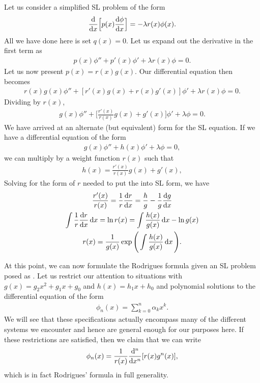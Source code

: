 Let us consider a simplified SL problem of the form
\begin{eqnarray}
    \dv{x} \Big[ p(x) \dv{\phi}{x} \Big] = -\lambda r(x) \phi(x)
.\end{eqnarray}
All we have done here is set $q(x) = 0$.
Let us expand out the derivative in the first term as
\begin{eqnarray}
    p(x) \phi'' + p'(x) \phi' + \lambda r(x) \phi = 0
.\end{eqnarray}
Let us now present $p(x) = r(x) g(x)$.
Our differential equation then becomes
\begin{eqnarray}
    r(x) g(x) \phi'' + [r'(x) g(x) + r(x) g'(x)] \phi' + \lambda r(x) \phi = 0
.\end{eqnarray}
Dividing by $r(x)$,
\begin{eqnarray}
    g(x) \phi'' + \Big[ \frac{r'(x)}{r(x)} g(x) + g'(x) \Big] \phi' + \lambda \phi = 0
.\end{eqnarray}
We have arrived at an alternate (but equivalent) form for the SL equation.
If we have a differential equation of the form
\begin{eqnarray}
    \label{eq:general-2nd-ode}
    g(x) \phi'' + h(x) \phi' + \lambda \phi = 0
,\end{eqnarray}
we can multiply by a weight function $r(x)$ such that
\begin{eqnarray}
    h(x) = \frac{r'(x)}{r(x)} g(x) + g'(x)
,\end{eqnarray}
Solving for the form of $r$ needed to put the  into SL form, we have
\begin{gather}
    \frac{r'(x)}{r(x)} = \frac{1}{r} \dv{r}{x} = \frac{h}{g} - \frac{1}{g}\dv{g}{x} \nonumber \\
    \int \frac{1}{r}\dv{r}{x} \dd{x} = \ln{r(x)} = \int \frac{h(x)}{g(x)} \dd{x} - \ln{g(x)} \nonumber \\
    r(x) = \frac{1}{g(x)} \exp\Bigg( \int \frac{h(x)}{g(x)} \dd{x} \Bigg)
.\end{gather}

At this point, we can now formulate the Rodrigues formula given an SL problem posed as .
Let us restrict our attention to situations with $g(x) = g_2 x^2 + g_1 x + g_0$ and $h(x) = h_1 x + h_0$ and polynomial solutions to the differential equation of the form
\begin{eqnarray}
    \phi_{n}(x) = \sum_{k=0}^{n} \alpha_{k} x^{k}
.\end{eqnarray}
We will see that these specifications actually encompass many of the different systems we encounter and hence are general enough for our purposes here.
If these restrictions are satisfied, then we claim that we can write
\begin{eqnarray}
    \label{eq:rodrigues-form-gen}
    \phi_{n}(x) = \frac{1}{r(x)} \dv[n]{x} [r(x)g^{n}(x)]
,\end{eqnarray}
which is in fact Rodrigues' formula in full generality.


